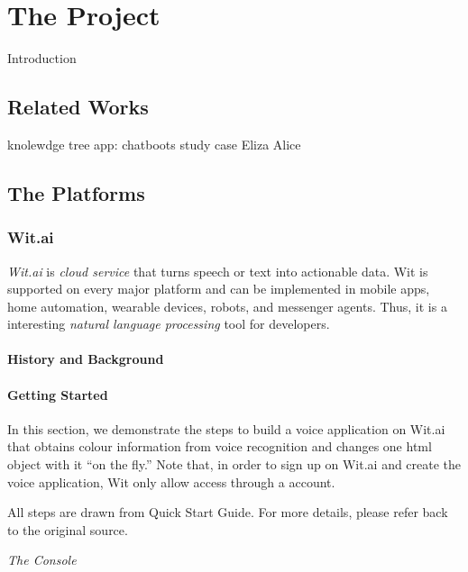 \chapter{The Project}
\label{sec:project}



Introduction


\section{Related Works}

knolewdge tree
app: chatboots
study case
Eliza
Alice

\section{The Platforms}

\subsection{Wit.ai}

\emph{Wit.ai} is \emph{cloud service} that turns speech or text into actionable data.
Wit is supported on every major platform and can be implemented in mobile apps, home automation, wearable devices, robots, and messenger agents.
Thus, it is a interesting \emph{natural language processing} tool for developers.

\subsubsection{History and Background}

\subsubsection{Getting Started}


In this section, we demonstrate the steps to build a voice application on Wit.ai that obtains colour information from voice recognition and changes one html object with it ``on the fly.''
Note that, in order to sign up on Wit.ai and create the voice application, Wit only allow access through a \cite{github_2016} account.

All steps are drawn from \cite{1_wit.ai_2016} Quick Start Guide.
For more details, please refer back to the original source.

\emph{The Console}

